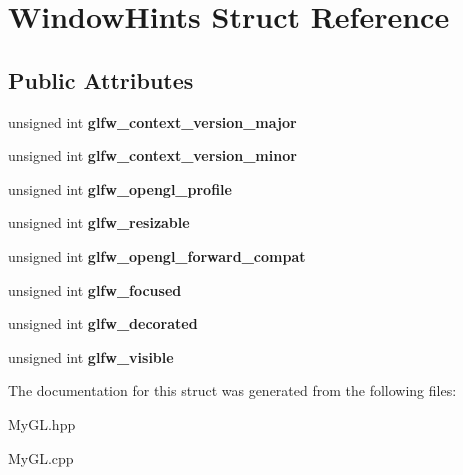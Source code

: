 \hypertarget{structWindowHints}{}\section{Window\+Hints Struct Reference}
\label{structWindowHints}
\subsection*{Public Attributes}
\begin{DoxyCompactItemize}
\item 
\hypertarget{structWindowHints_a90dcc3c10eff6e9fd9e9731f2098283b}{}unsigned int {\bfseries glfw\+\_\+context\+\_\+version\+\_\+major}\label{structWindowHints_a90dcc3c10eff6e9fd9e9731f2098283b}

\item 
\hypertarget{structWindowHints_aacea0367d5d087bedca46b89db634963}{}unsigned int {\bfseries glfw\+\_\+context\+\_\+version\+\_\+minor}\label{structWindowHints_aacea0367d5d087bedca46b89db634963}

\item 
\hypertarget{structWindowHints_afd6fae98a69a4ba82c1c52ef1ea48f36}{}unsigned int {\bfseries glfw\+\_\+opengl\+\_\+profile}\label{structWindowHints_afd6fae98a69a4ba82c1c52ef1ea48f36}

\item 
\hypertarget{structWindowHints_a0fc16ab2b3016a981bb6983459e68e39}{}unsigned int {\bfseries glfw\+\_\+resizable}\label{structWindowHints_a0fc16ab2b3016a981bb6983459e68e39}

\item 
\hypertarget{structWindowHints_ac5865247be3897b58f28c094035ea74b}{}unsigned int {\bfseries glfw\+\_\+opengl\+\_\+forward\+\_\+compat}\label{structWindowHints_ac5865247be3897b58f28c094035ea74b}

\item 
\hypertarget{structWindowHints_a3f9ec495707991985a0105a55e9ab8b4}{}unsigned int {\bfseries glfw\+\_\+focused}\label{structWindowHints_a3f9ec495707991985a0105a55e9ab8b4}

\item 
\hypertarget{structWindowHints_af8ee369e4bf0d0325f89911bbff4845a}{}unsigned int {\bfseries glfw\+\_\+decorated}\label{structWindowHints_af8ee369e4bf0d0325f89911bbff4845a}

\item 
\hypertarget{structWindowHints_a7d5abc43b09c0dec6a87fe0d43cb55aa}{}unsigned int {\bfseries glfw\+\_\+visible}\label{structWindowHints_a7d5abc43b09c0dec6a87fe0d43cb55aa}

\end{DoxyCompactItemize}


The documentation for this struct was generated from the following files\+:\begin{DoxyCompactItemize}
\item 
My\+G\+L.\+hpp\item 
My\+G\+L.\+cpp\end{DoxyCompactItemize}

